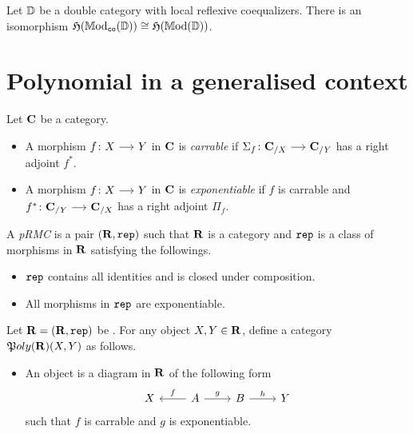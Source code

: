 \documentclass[a4paper,dvipsnames, 11pt]{amsart} %
\begin{document}
\begin{lemma}
	Let $\mathbb{D}$ be a double category with local reflexive coequalizers.
	There is an isomorphism ${\mathfrak{H}}(\mathbb{M}\mathrm{od}_{\mathtt{co}}(\mathbb{D}))\cong{\mathfrak{H}}(\mathbb{M}\mathrm{od}(\mathbb{D}))$.
\end{lemma}
\begin{definition}
\end{definition}
\section{Polynomial in a generalised context}
\begin{definition}
	Let $\mathbf{C}$ be a category.
	\begin{itemize}
		\item %
			A morphism $f\colon X\arr Y$ in $\mathbf{C}$ is \emph{carrable} if
			$\Sigma_f\colon\one{C}_{/X}\arr\one{C}_{/Y}$ has a right adjoint $f^*$.
		\item %
			A morphism $f\colon X\arr Y$ in $\mathbf{C}$ is \emph{exponentiable} if $f$
			is carrable and $f^*\colon\one{C}_{/Y}\arr\one{C}_{/X}$ has a right adjoint $\Pi_f$.
		\qedhere %
	\end{itemize}
\end{definition}
\begin{definition}
	A \emph{\ac{pRMC}} is a pair $(\mathbf{R},\mathtt{rep})$
	such that $\mathbf{R}$ is a category
	and $\mathtt{rep}$ is a class of morphisms in $\mathbf{R}$ satisfying the followings.
	\begin{itemize}
		\item %
			$\mathtt{rep}$ contains all identities and is closed under composition.
		\item %
			All morphisms in $\mathtt{rep}$ are exponentiable.
		\qedhere %
	\end{itemize}
\end{definition}
\begin{definition}
	Let $\mathbf{R}=(\mathbf{R},\mathtt{rep})$ be .
	For any object $X,Y\in\mathbf{R}$,
	define a category ${\mathfrak{P}}{oly}(\mathbf{R})(X,Y)$ as follows.
	\begin{itemize}
		\item %
			An object is a diagram in $\mathbf{R}$
			of the following form
			\[
				\begin{tikzcd}
					X
					&
					A
					\ar[l,"f"']
					\ar[r,"g"]
					&
					B
					\ar[r,"h"]
					&
					Y
				\end{tikzcd}
			\]
			such that $f$ is carrable and $g$ is exponentiable.
	\end{itemize}
\end{definition}



\end{document}

